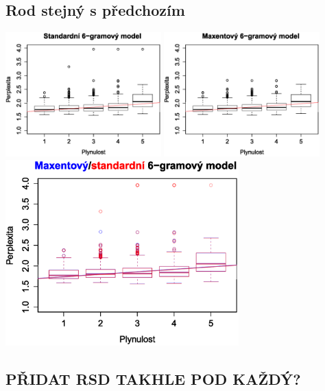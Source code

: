 \documentclass[12pt,a4paper]{report}
\begin{document}
\subsection{Rod stejný s předchozím}
\begin{center}
	\includegraphics[width=60mm]{./grafy/morf/ngram/rodstejny.svg.eps}
	\includegraphics[width=60mm]{./grafy/morf/maxent/rodstejny.svg.eps}
	\includegraphics[width=90mm]{./grafy/morf/porovnani/rodstejny.svg.eps}	
\end{center}
\subsection{PŘIDAT RSD TAKHLE POD KAŽDÝ?}
\end{document}
